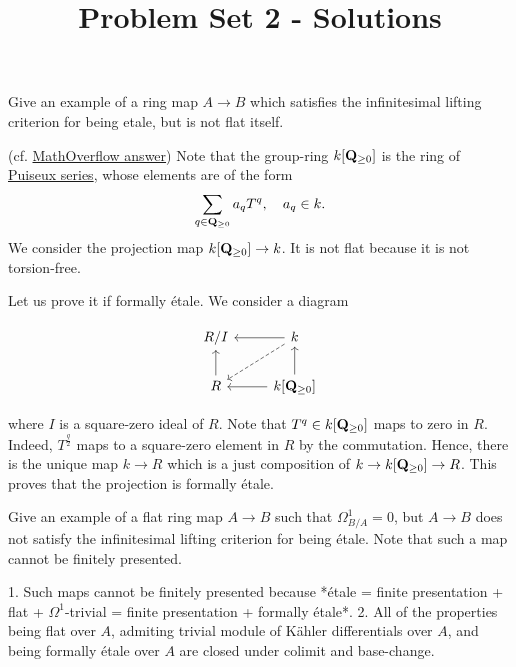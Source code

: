 \documentclass{amsart}
\title{Problem Set 2 - Solutions}
\begin{document}
\maketitle

\begin{problem}
    Give an example of a ring map $A \to B$ which satisfies the infinitesimal lifting criterion for being etale, but is not flat itself.
\end{problem}

\proof (cf. \href{https://mathoverflow.net/a/200}{MathOverflow answer}) Note that the group-ring $k[\mathbf{Q}_{\ge 0}]$ is the ring of \href{https://en.wikipedia.org/wiki/Puiseux\_series}{Puiseux series}, whose elements are of the form
$$ \sum_{q \in \mathbf{Q}_{\ge 0}} a_{q} T^{q}, \quad a_{q} \in k. $$
We consider the projection map $k[\mathbf{Q}_{\ge 0}] \to k$. It is not flat because it is not torsion-free.

Let us prove it if formally étale. We consider a diagram

\[\begin{tikzcd}
	{R/I} & k \\
	R & {k[\mathbf Q_{\ge 0}]}
	\arrow[from=2-2, to=1-2]
	\arrow[from=1-2, to=1-1]
	\arrow[from=2-1, to=1-1]
	\arrow[from=2-2, to=2-1]
	\arrow[dashed, from=1-2, to=2-1]
\end{tikzcd}\]

where $I$ is a square-zero ideal of $R$. Note that $T^{q} \in k[\mathbf{Q}_{\ge 0}]$ maps to zero in $R$. Indeed, $T^{\frac{q}{2}}$ maps to a square-zero element in $R$ by the commutation. Hence, there is the unique map $k \to R$ which is a just composition of $k \to k[\mathbf{Q}_{\ge 0}] \to R$. This proves that the projection is formally étale.

\newpage

\begin{problem}
    Give an example of a flat ring map $A \to B$ such that $\Omega^{1}_{B/A} = 0$, but $A \to B$ does not satisfy the infinitesimal lifting criterion for being étale. Note that such a map cannot be finitely presented.
\end{problem}

\begin{remark}
    1. Such maps cannot be finitely presented because *étale = finite presentation + flat + $\Omega^{1}$-trivial = finite presentation + formally étale*.
    2. All of the properties being flat over $A$, admiting trivial module of Kähler differentials over $A$, and being formally étale over $A$ are closed under colimit and base-change.
\end{remark}
\end{document}
